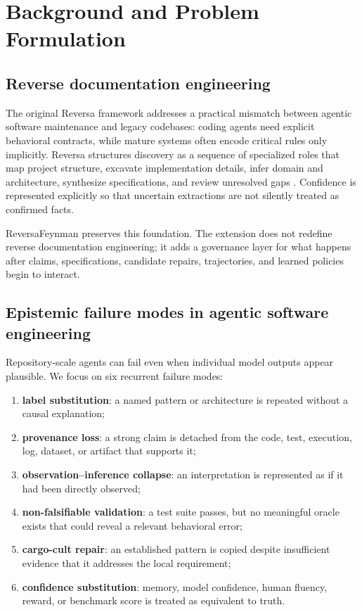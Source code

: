 \section{Background and Problem Formulation}

\subsection{Reverse documentation engineering}

The original Reversa framework addresses a practical mismatch between agentic software maintenance and legacy codebases: coding agents need explicit behavioral contracts, while mature systems often encode critical rules only implicitly. Reversa structures discovery as a sequence of specialized roles that map project structure, excavate implementation details, infer domain and architecture, synthesize specifications, and review unresolved gaps \cite{macedo2026reversa}. Confidence is represented explicitly so that uncertain extractions are not silently treated as confirmed facts.

ReversaFeynman preserves this foundation. The extension does not redefine reverse documentation engineering; it adds a governance layer for what happens after claims, specifications, candidate repairs, trajectories, and learned policies begin to interact.

\subsection{Epistemic failure modes in agentic software engineering}

Repository-scale agents can fail even when individual model outputs appear plausible. We focus on six recurrent failure modes:

\begin{enumerate}
  \item \textbf{label substitution}: a named pattern or architecture is repeated without a causal explanation;
  \item \textbf{provenance loss}: a strong claim is detached from the code, test, execution, log, dataset, or artifact that supports it;
  \item \textbf{observation--inference collapse}: an interpretation is represented as if it had been directly observed;
  \item \textbf{non-falsifiable validation}: a test suite passes, but no meaningful oracle exists that could reveal a relevant behavioral error;
  \item \textbf{cargo-cult repair}: an established pattern is copied despite insufficient evidence that it addresses the local requirement;
  \item \textbf{confidence substitution}: memory, model confidence, human fluency, reward, or benchmark score is treated as equivalent to truth.
\end{enumerate}

